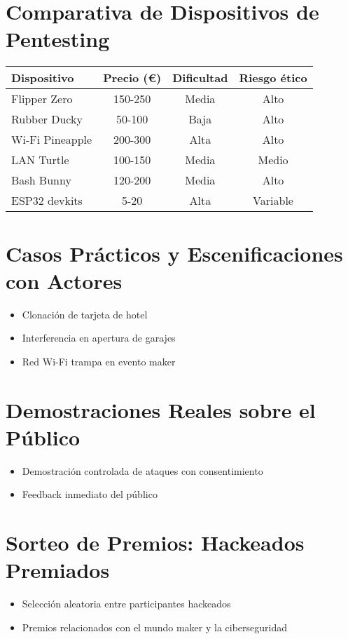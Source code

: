 \documentclass[a4paper,12pt]{article}
\begin{document}
\section{Comparativa de Dispositivos de Pentesting}

\begin{tabular}{|l|c|c|c|}
\hline
\textbf{Dispositivo} & \textbf{Precio (€)} & \textbf{Dificultad} & \textbf{Riesgo ético} \\
\hline
Flipper Zero & 150-250 & Media & Alto \\
Rubber Ducky & 50-100 & Baja & Alto \\
Wi-Fi Pineapple & 200-300 & Alta & Alto \\
LAN Turtle & 100-150 & Media & Medio \\
Bash Bunny & 120-200 & Media & Alto \\
ESP32 devkits & 5-20 & Alta & Variable \\
\hline
\end{tabular}

\section{Casos Prácticos y Escenificaciones con Actores}

\begin{itemize}
    \item Clonación de tarjeta de hotel
    \item Interferencia en apertura de garajes
    \item Red Wi-Fi trampa en evento maker
\end{itemize}

\section{Demostraciones Reales sobre el Público}

\begin{itemize}
    \item Demostración controlada de ataques con consentimiento
    \item Feedback inmediato del público
\end{itemize}

\section{Sorteo de Premios: Hackeados Premiados}

\begin{itemize}
    \item Selección aleatoria entre participantes hackeados
    \item Premios relacionados con el mundo maker y la ciberseguridad
\end{itemize}
\end{document}
